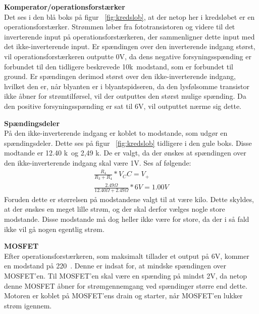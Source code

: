 \textbf{Komperator/operationsforstærker} \\
Det ses i den blå boks på figur ~\ref{fig:kredslob}, at der netop her i kredsløbet er en operationsforstærker. 
 Strømmen løber fra fototransistoren og videre til det inverterende input på operationsforstærkeren, der sammenligner dette input med det ikke-inverterende input. Er spændingen over den inverterende indgang størst, vil operationsforstærkeren outputte 0V, da dens negative forsyningsspænding er forbundet til den tidligere beskrevede 10k\textOmega\ modstand, som er forbundet til ground. Er spændingen derimod størst over den ikke-inverterende indgang, hvilket den er, når blyanten er i blyantspidseren, da den lysfølsomme transistor ikke åbner for strømtilførsel, vil der outputtes den størst mulige spænding. Da den positive forsyningsspænding er sat til 6V, vil outputtet nærme sig dette.
 
\textbf{Spændingsdeler} \\
På den ikke-inverterende indgang er koblet to modstande, som udgør en spændingsdeler. Dette ses på figur ~\ref{fig:kredslob} tidligere i den gule boks. Disse modtande er 12.40 k\textOmega\ og 2,49 k\textOmega . De er valgt, da der ønskes at spændingen over den ikke-inverterende indgang skal være 1V. Ses af følgende:
\begin{align}
\frac{R_4}{R_3+R_4}*V_CC=V_+\\
\frac{2.49\Omega}{12.40\Omega+2.49\Omega}*6V=1.00V
\end{align}
Foruden dette er størrelsen på modstandene valgt til at være kilo. Dette skyldes, at der ønskes en meget lille strøm, og der skal derfor vælges nogle store modstande. Disse modstande må dog heller ikke være for store, da der i så fald ikke vil gå nogen egentlig strøm.

\textbf{MOSFET}\\
Efter operationsforstærkeren, som maksimalt tillader et output på 6V, kommer en modstand på 220\textOmega\ . Denne er indsat for, at mindske spændingen over MOSFET'en. Til MOSFET'en skal være en spænding på mindst 2V, da netop denne MOSFET åbner for strømgennemgang ved spændinger større end dette. Motoren er koblet på MOSFET'ens drain og starter, når MOSFET'en lukker strøm igennem.